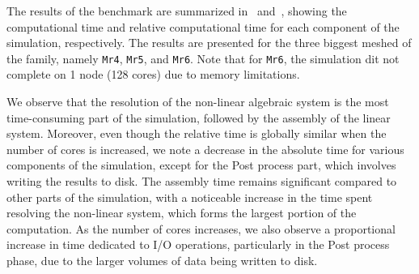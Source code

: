 The results of the benchmark are summarized in~ and~,
showing the computational time and relative computational time for each component of the simulation, respectively.
The results are presented for the three biggest meshed of the family, namely \texttt{Mr4}, \texttt{Mr5}, and \texttt{Mr6}.
Note that for \texttt{Mr6}, the simulation dit not complete on 1 node (128 cores) due to memory limitations.

We observe that the resolution of the non-linear algebraic system is the most time-consuming part of the simulation, followed by the assembly of the linear system.
Moreover, even though the relative time is globally similar when the number of cores is increased, we note a decrease in the absolute time for various components of the simulation, except for the Post process part, which involves writing the results to disk.
The assembly time remains significant compared to other parts of the simulation, with a noticeable increase in the time spent resolving the non-linear system, which forms the largest portion of the computation.
As the number of cores increases, we also observe a proportional increase in time dedicated to I/O operations, particularly in the Post process phase, due to the larger volumes of data being written to disk.



\dataMQuatre
{}\dataMCinq
{}\dataMSix

